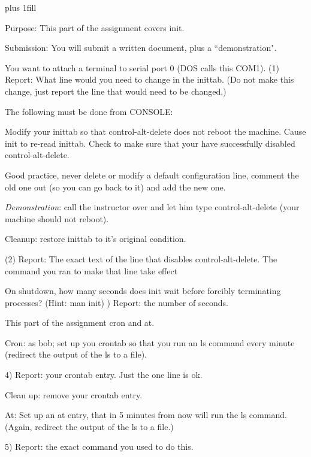 
\rightskip=0pt plus 1fill

\parindent 0pt

Purpose: This part of the assignment covers init.

Submission: You will submit a written document, plus a ``demonstration".

You want to attach a terminal to serial port 0 (DOS calls this COM1).
(1) Report: What line would you need to change in the inittab.
(Do not make this change, just report the line that would need
to be changed.)

The following must be done from CONSOLE:

Modify your {\ltt{}inittab} so that control-alt-delete does not
reboot the machine.
Cause {\ltt{}init} to re-read {\ltt{}inittab}.
Check to make sure that your have successfully disabled control-alt-delete.

Good practice, never delete or modify a default configuration line, 
comment the old one out (so you can go back to it) and add the new one.

{\it Demonstration}: 
call the instructor over and let him type control-alt-delete
(your machine should not reboot).

Cleanup: restore {\ltt{}inittab} to it's original condition. 

(2) Report: The exact text of the line that disables control-alt-delete.
The command you ran to make that line take effect

On shutdown, how many seconds does {\ltt{}init} wait before 
forcibly terminating processes? (Hint: {\ltt{}man init})
) Report: the number of seconds.

This part of the assignment cron and at.

Cron: as bob; set up you crontab so that you run an {\ltt{}ls} command
every minute (redirect the output of the {\ltt{}ls} to a file). 

4) Report: your crontab entry. Just the one line is ok.

Clean up: remove your crontab entry.

At: Set up an at entry, that in 5 minutes from now will
run the {\ltt{}ls} command.
(Again, redirect the output of the {\ltt{}ls} to a file.) 

5) Report: the exact command you used to do this.

\bye
